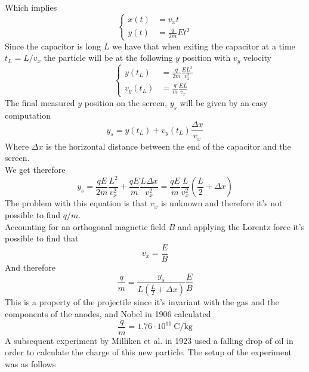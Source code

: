 \documentclass[../qm.tex]{subfiles}
\begin{document}
Which implies
\begin{equation*}
	\left\{\begin{aligned}
		x(t)&=v_xt\\
		y(t)&=\frac{q}{2m}Et^2
	\end{aligned}\right.
\end{equation*}
Since the capacitor is long $L$ we have that when exiting the capacitor at a time $t_L=L/v_x$ the particle will be at the following $y$ position with $v_y$ velocity
\begin{equation*}
	\left\{ \begin{aligned}
			y(t_L)&=\frac{q}{2m}\frac{EL^2}{v^2_x}\\
			v_y(t_L)&=\frac{q}{m}\frac{EL}{v_x}
	\end{aligned}\right.
\end{equation*}
The final measured $y$ position on the screen, $y_s$ will be given by an easy computation
\begin{equation*}
	y_s=y(t_L)+v_y(t_L)\frac{\Delta x}{v_x}
\end{equation*}
Where $\Delta x$ is the horizontal distance between the end of the capacitor and the screen.\\
We get therefore
\begin{equation}
	y_s=\frac{qE}{2m}\frac{L^2}{v_x^2}+\frac{qE}{m}\frac{L\Delta x}{v_x^2}=\frac{qE}{m}\frac{L}{v_x^2}\left( \frac{L}{2}+\Delta x \right)
	\label{eq:yscreenthomp}
\end{equation}
The problem with this equation is that $v_x$ is unknown and therefore it's not possible to find $q/m$.\\
Accounting for an orthogonal magnetic field $B$ and applying the Lorentz force it's possible to find that
\begin{equation*}
	v_x=\frac{E}{B}
\end{equation*}
And therefore
\begin{equation}
	\frac{q}{m}=\frac{y_s}{L\left( \frac{L}{2}+\Delta x \right)}\frac{E}{B}
	\label{eq:qmelectron}
\end{equation}
This is a property of the projectile since it's invariant with the gas and the components of the anodes, and Nobel in 1906 calculated
\begin{equation*}
	\frac{q}{m}=1.76\cdot10^{11}\ \mathrm{C/kg}
\end{equation*}
A subsequent experiment by Milliken et al. in 1923 used a falling drop of oil in order to calculate the charge of this new particle.
The setup of the experiment was as follows
\end{document}
